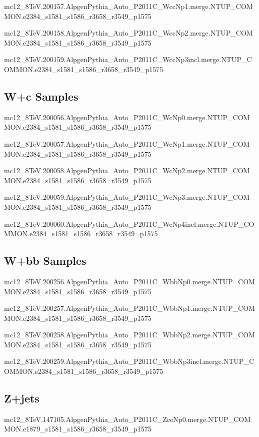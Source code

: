    mc12\_8TeV.200157.AlpgenPythia\_Auto\_P2011C\_WccNp1.merge.NTUP\_COMMON.e2384\_s1581\_s1586\_r3658\_r3549\_p1575

   mc12\_8TeV.200158.AlpgenPythia\_Auto\_P2011C\_WccNp2.merge.NTUP\_COMMON.e2384\_s1581\_s1586\_r3658\_r3549\_p1575

   mc12\_8TeV.200159.AlpgenPythia\_Auto\_P2011C\_WccNp3incl.merge.NTUP\_COMMON.e2384\_s1581\_s1586\_r3658\_r3549\_p1575


\subsection{W+c Samples}
   mc12\_8TeV.200056.AlpgenPythia\_Auto\_P2011C\_WcNp0.merge.NTUP\_COMMON.e2384\_s1581\_s1586\_r3658\_r3549\_p1575

   mc12\_8TeV.200057.AlpgenPythia\_Auto\_P2011C\_WcNp1.merge.NTUP\_COMMON.e2384\_s1581\_s1586\_r3658\_r3549\_p1575

   mc12\_8TeV.200058.AlpgenPythia\_Auto\_P2011C\_WcNp2.merge.NTUP\_COMMON.e2384\_s1581\_s1586\_r3658\_r3549\_p1575

   mc12\_8TeV.200059.AlpgenPythia\_Auto\_P2011C\_WcNp3.merge.NTUP\_COMMON.e2384\_s1581\_s1586\_r3658\_r3549\_p1575

   mc12\_8TeV.200060.AlpgenPythia\_Auto\_P2011C\_WcNp4incl.merge.NTUP\_COMMON.e2384\_s1581\_s1586\_r3658\_r3549\_p1575

   
\subsection{W+bb Samples}
   mc12\_8TeV.200256.AlpgenPythia\_Auto\_P2011C\_WbbNp0.merge.NTUP\_COMMON.e2384\_s1581\_s1586\_r3658\_r3549\_p1575

   mc12\_8TeV.200257.AlpgenPythia\_Auto\_P2011C\_WbbNp1.merge.NTUP\_COMMON.e2384\_s1581\_s1586\_r3658\_r3549\_p1575

   mc12\_8TeV.200258.AlpgenPythia\_Auto\_P2011C\_WbbNp2.merge.NTUP\_COMMON.e2384\_s1581\_s1586\_r3658\_r3549\_p1575

   mc12\_8TeV.200259.AlpgenPythia\_Auto\_P2011C\_WbbNp3incl.merge.NTUP\_COMMON.e2384\_s1581\_s1586\_r3658\_r3549\_p1575


\subsection{Z+jets}
mc12\_8TeV.147105.AlpgenPythia\_Auto\_P2011C\_ZeeNp0.merge.NTUP\_COMMON.e1879\_s1581\_s1586\_r3658\_r3549\_p1575

